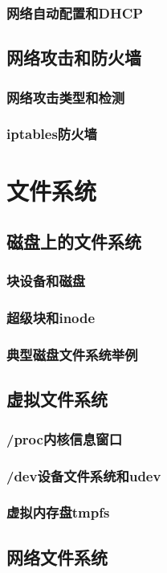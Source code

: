 \documentclass[amstex,twoside]{ctexbook}
\begin{document}
\subsection{ 网络自动配置和DHCP}
\section{  网络攻击和防火墙	}
\subsection{ 网络攻击类型和检测}
\subsection{  iptables防火墙}

\chapter{文件系统}
\section{  磁盘上的文件系统	}
\subsection{  块设备和磁盘}
\subsection{ 超级块和inode}
\subsection{  典型磁盘文件系统举例}
\section{  虚拟文件系统	}
\subsection{  /proc内核信息窗口}
\subsection{  /dev设备文件系统和udev}
\subsection{  虚拟内存盘tmpfs}
\section{  网络文件系统	}
\end{document}
